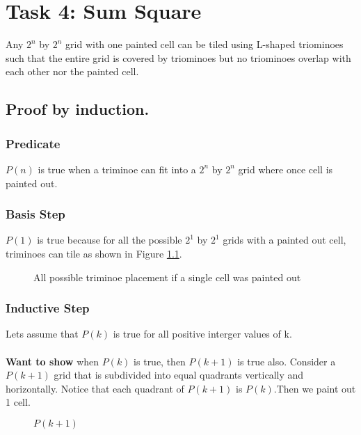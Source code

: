 \chapter{Task 4: Sum Square}
\begin{thm}[]
	Any $2^n$ by $2^n$
	grid with one painted cell can be tiled using L-shaped triominoes
	such that the entire grid is covered by triominoes but no triominoes overlap with each other
	nor the painted cell. 
	\par
\end{thm}	



\section{Proof by induction.}
\subsection{Predicate}
$P(n)$ is true when a triminoe can fit into a $2^n$ by $2^n$ grid where once cell is painted out.

\subsection{Basis Step}
$P(1)$ is true because for all the possible $2^1$ by $2^1$ grids with a painted out cell, triminoes can tile as shown in Figure \ref{fig:base-cases}. 

\begin{figure}[h]
	\centering
	\caption{All possible triminoe placement if a single cell was painted out}
	\label{fig:base-cases}
\end{figure}

\subsection{Inductive Step}
Lets assume that $P(k)$ is true for all positive interger values of k.\\\\
\textbf{Want to show} when $P(k)$ is true, then $P(k+1)$ is true also.
Consider a $P(k+1)$ grid that is subdivided into equal quadrants vertically and horizontally. Notice that each quadrant of $P(k+1)$ is $P(k)$.Then we paint out 1 cell.\\

\begin{figure}[ht]
	\vspace{-10pt}
	\centering
	\vspace{-10pt}
	\caption{$P(k+1)$}
	\label{fig:T1-figure2}
\end{figure}

